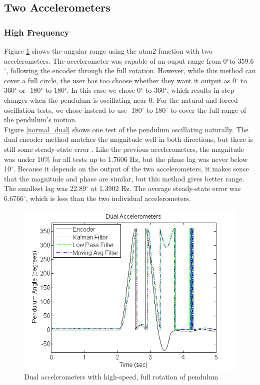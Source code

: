 \documentclass{article}
\theoremstyle{plain}
\theoremstyle{definition}
\theoremstyle{remark}
\begin{document}
\clearpage
\subsection{Two Accelerometers}
\subsubsection{High Frequency}

Figure \ref{full_Dual} shows the angular range using the atan2 function with two accelerometers. The accelerometer was capable of an ouput range from 0$^{\circ}$to 359.6$^{\circ}$, following the encoder through the full rotation. However, while this method can cover a full circle, the user has too choose whether they want it output as 0$^{\circ}$ to 360$^{\circ}$ or -180$^{\circ}$ to 180$^{\circ}$. In this case we chose 0$^{\circ}$ to 360$^{\circ}$, which results in step changes when the pendulum is oscillating near 0. For the natural and forced oscillation tests, we chose instead to use -180$^{\circ}$ to 180$^{\circ}$ to cover the full range of the pendulum's motion. \\

Figure \ref{normal_dual} shows one test of the pendulum oscillating naturally. The dual encoder method matches the magnitude well in both directions, but there is still some steady-state error . Like the previous accelerometers, the magnitude was under 10\% for all tests up to 1.7606 Hz, but the phase lag was never below 10$^{\circ}$. Because it depends on the output of the two accelerometers, it makes sense that the magnitude and phase are similar, but this method gives better range. The smallest lag was 22.89$^{\circ}$ at 1.3902 Hz. The average steady-state error was 6.6766$^{\circ}$, which is less than the two individual accelerometers.\\ 

\begin{figure}[hbt]
\begin{center}
\includegraphics[width = 12cm]{FullRotation_Dual.png}
\caption{Dual accelerometers with high-speed, full rotation of pendulum}
\label{full_Dual}
\end{center}
\end{figure}
\end{document}
